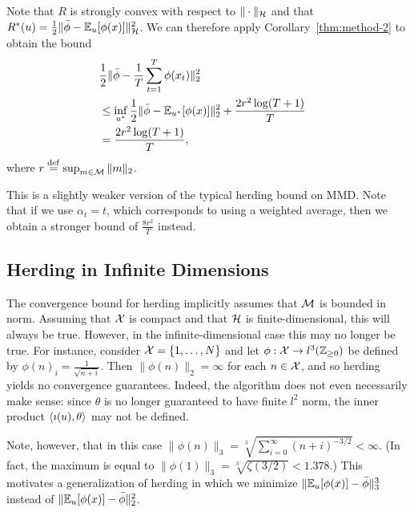 \documentclass[paper.tex]{subfiles}
\begin{document}
Note that $R$ is strongly convex with respect to $\|\cdot\|_{\mathcal{H}}$ and that 
$R^*(u) = \frac{1}{2}\|\bar{\phi}-\mathbb{E}_{u}[\phi(x)]\|_{\mathcal{H}}^2$. We can 
therefore apply Corollary~\ref{thm:method-2} to obtain the bound
\begin{align*}
\lefteqn{\frac{1}{2}\|\bar{\phi}-\frac{1}{T}\sum_{t=1}^T \phi(x_t)\|_2^2} \\
 &\leq \inf_{u^*} \frac{1}{2}\|\bar{\phi}-\bE_{u^*}[\phi(x)]\|_2^2 + \frac{2r^2\log(T+1)}{T} \\
 &= \frac{2r^2\log(T+1)}{T},
\end{align*}
where $r \stackrel{\mathrm{def}}{=} \sup_{m \in \mathcal{M}} \|m\|_2$.

This is a slightly weaker version of the typical herding bound on MMD.
Note that if we use $\alpha_t = t$, which corresponds to using a weighted 
average, then we obtain a stronger bound of $\frac{8r^2}{T}$ instead.

\subsection{Herding in Infinite Dimensions}
\label{sec:infinite-case}

The convergence bound for herding implicitly assumes that 
$\mathcal{M}$ is bounded in norm. Assuming that $\mathcal{X}$ is compact 
and that $\mathcal{H}$ is finite-dimensional, this will always be true. However, in 
the infinite-dimensional case this may no longer be true. 
For instance, consider $\mathcal{X} = \{1,\ldots,N\}$ and let 
$\phi : \mathcal{X} \to l^3(\mathbb{Z}_{\geq 0})$ be
defined by $\phi(n)_i = \frac{1}{\sqrt{n+i}}$. Then 
$\|\phi(n)\|_2 = \infty$ for each $n \in \mathcal{X}$, and so herding 
yields no convergence guarantees. Indeed, the algorithm 
does not even necessarily make sense: since $\theta$ is 
no longer guaranteed to have finite $l^2$ norm, the 
inner product $\left\langle \imath(u), \theta \right\rangle$ may not be defined.

Note, however, that in this case
$\|\phi(n)\|_3 = \sqrt[3]{\sum_{i=0}^{\infty} (n+i)^{-3/2}} < \infty$.
(In fact, the maximum is equal to
$\|\phi(1)\|_3 = \sqrt[3]{\zeta(3/2)} < 1.378$.) This motivates 
a generalization of herding in which we minimize 
$\|\mathbb{E}_{u}[\phi(x)]-\bar{\phi}\|_3^3$ instead of 
$\|\mathbb{E}_{u}[\phi(x)]-\bar{\phi}\|_2^2$.
\end{document}
